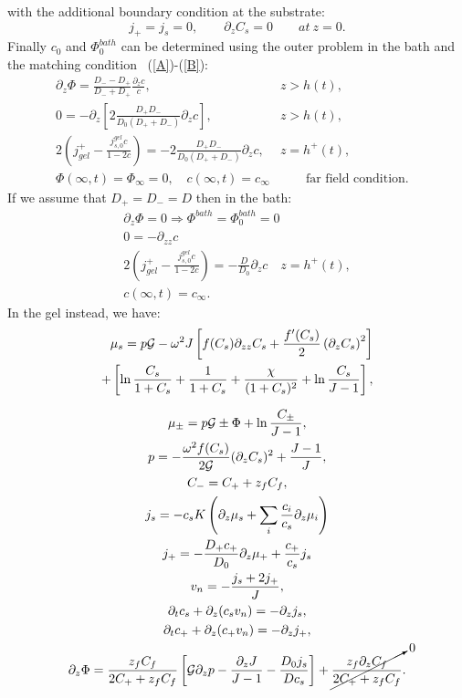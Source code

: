 \documentclass[12pt]{extarticle}
\begin{document}
with the additional boundary condition at the substrate:
\begin{equation}
j_+= j_s = 0, \qquad \partial_z C_s=0 \qquad at\  z=0.
\end{equation}
Finally $c_0$ and $\Phi^{bath}_0$ can be determined using the outer problem in the bath and the matching condition ~(\ref{A})-(\ref{B}):
\begin{eqnarray}
 \partial_z \Phi = \frac{D_--D_+}{D_-+D_+} \frac{\partial_z c}{c}, &z>h(t),&\\
0 = -\partial_z\left[2\frac{D_+D_-}{D_0(D_++D_-)}  \partial_z c\right], &z>h(t),&\\
2\left(j^+_{gel}-\frac{j_{s,0}^{gel}c}{1-2c}\right) =- 2 \frac{D_+D_-}{D_0(D_++D_-)}\partial_z c, & z=h^+(t),&\\
\Phi(\infty,t)=\Phi_\infty=0,\quad c(\infty,t)=c_\infty &\qquad\text{far field condition}.&
\end{eqnarray}
If we assume that $D_+=D_-=D$ then in the bath:
\begin{gather}
\partial_z \Phi=0 \Rightarrow \Phi^{bath}=\Phi^{bath}_0=0\\
0 = -\partial_{zz}c\\
2\left(j^+_{gel}-\frac{j_{s,0}^{gel}c}{1-2c}\right)=-\frac{D}{D_0} \partial_z c \quad z=h^{+}(t),\\
c(\infty,t)=c_\infty.
\end{gather}
In the gel instead, we have:
\begin{gather}
\begin{aligned}
\mu_s = p \mathcal{G}  - \omega^2 J \left[f(C_s)\partial_{zz} C_s+\frac{f'(C_s)}{2}\left(\partial_z C_s\right)^2\right]\\
+ \left[\ln \frac{C_s}{1+C_s} + \frac{1}{1+C_s}+\frac{\chi}{(1+C_s)^2} + \ln \frac{C_s}{J-1} \right], 
\end{aligned}\\[2.5mm]
\mu_\pm = p \mathcal{G} \pm \Phi + \ln \frac{C_\pm}{J-1} ,\\
p=-\frac{\omega^2 f(C_s)}{2\mathcal{G}} (\partial_z C_s)^2+ \frac{J-1}{J},\\
C_- = C_+ + z_f C_f,\\
j_s =-c_sK  \left(\partial_z\mu_s +\sum_i \frac{c_i}{c_s} \partial_z \mu_i\right)\\
j_+= - \frac{D_+ c_+}{D_0}\partial_z \mu_+ + \frac{c_+}{c_s}j_s\\
v_n = - \frac{j_s+2j_+}{J},\\
\partial_t c_s + \partial_z (c_s v_n)=- \partial_z j_s,\\
\partial_t c_+ +\partial_z (c_+ v_n)= -\partial_zj_+,\\
\partial_z \Phi = \frac{z_fC_f}{2C_++z_fC_f}\left[\mathcal{G}\partial_zp-\frac{\partial_z J}{J-1}-\frac{D_0j_s}{Dc_s}\right]+\cancelto{0}{\frac{z_f\partial_zC_f}{2C_++z_fC_f}}.
\end{gather}
\end{document}
